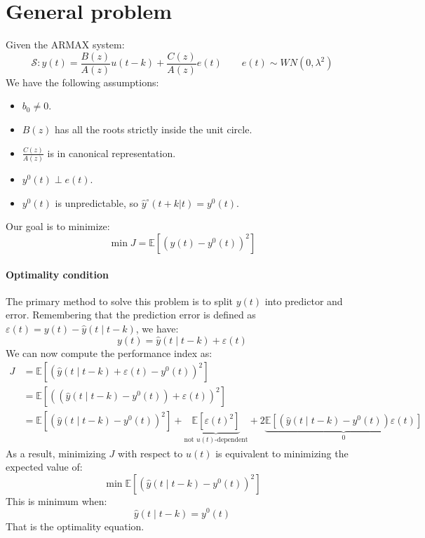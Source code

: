 \section{General problem}

Given the ARMAX system:
\[\mathcal{S}:y(t)=\dfrac{B(z)}{A(z)}u(t-k)+\dfrac{C(z)}{A(z)}e(t) \qquad e(t)\sim WN(0,\lambda^2)\]
We have the following assumptions:
\begin{itemize}
    \item $b_0\neq 0$. 
    \item $B(z)$ has all the roots strictly inside the unit circle.
    \item $\frac{C(z)}{A(z)}$ is in canonical representation. 
    \item $y^{0}(t)\perp e(t)$. 
    \item $y^{0}(t)$ is unpredictable, so $\hat{y}^\circ(t+k|t)=y^{0}(t)$. 
\end{itemize}
Our goal is to minimize:
\[\min{J}=\mathbb{E}\left[\left(y(t)-y^{0}(t)\right)^2\right]\]

\paragraph*{Optimality condition}
The primary method to solve this problem is to split $y(t)$  into predictor and error. 
Remembering that the prediction error is defined as $\varepsilon(t)=y(t)-\hat{y}(t\mid t-k)$, we have:
\[y(t)=\hat{y}(t\mid t-k)+\varepsilon(t)\]
We can now compute the performance index as:
\begin{align*}
    J   &=\mathbb{E}\left[\left(\hat{y}(t\mid t-k)+\varepsilon(t)-y^{0}(t)\right)^2\right] \\
        &=\mathbb{E}\left[\left(\left(\hat{y}(t\mid t-k)-y^{0}(t)\right)+\varepsilon(t)\right)^2\right] \\
        &=\mathbb{E}\left[\left(\hat{y}(t\mid t-k)-y^{0}(t)\right)^2\right]+\underbrace{\mathbb{E}\left[\varepsilon(t)^2\right]}_{\text{not }u(t)\text{-dependent}} +2\underbrace{\mathbb{E}\left[\left(\hat{y}(t\mid t-k)-y^{0}(t)\right)\varepsilon(t)\right]}_0 
\end{align*}
As a result, minimizing $J$ with respect to $u(t)$  is equivalent to minimizing the expected value of:
\[\min\mathbb{E}\left[\left(\hat{y}(t\mid t-k)-y^{0}(t)\right)^2\right]\]
This is minimum when:
\[\hat{y}(t\mid t-k)=y^{0}(t)\]
That is the optimality equation.

